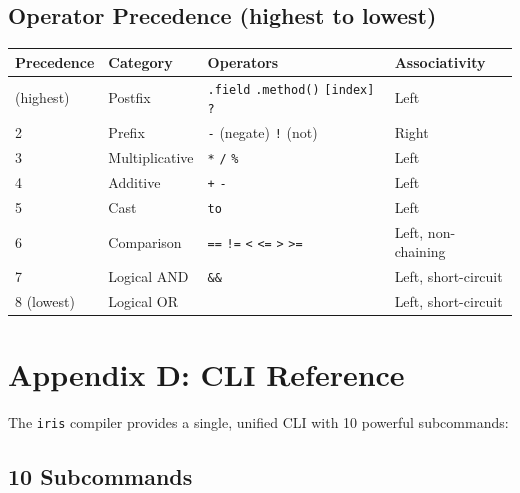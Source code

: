 \documentclass[
  english,
]{book}
\begin{document}
\subsection{Operator Precedence (highest to
lowest)}\label{operator-precedence-highest-to-lowest}

\begin{longtable}[]{@{}llll@{}}
\toprule\noalign{}
Precedence & Category & Operators & Associativity \\
\midrule\noalign{}
\endhead
\bottomrule\noalign{}
\endlastfoot
1 (highest) & Postfix & \texttt{.field} \texttt{.method()}
\texttt{{[}index{]}} \texttt{?} & Left \\
2 & Prefix & \texttt{-} (negate) \texttt{!} (not) & Right \\
3 & Multiplicative & \texttt{*} \texttt{/} \texttt{\%} & Left \\
4 & Additive & \texttt{+} \texttt{-} & Left \\
5 & Cast & \texttt{to} & Left \\
6 & Comparison & \texttt{==} \texttt{!=} \texttt{\textless{}}
\texttt{\textless{}=} \texttt{\textgreater{}} \texttt{\textgreater{}=} &
Left, non-chaining \\
7 & Logical AND & \texttt{\&\&} & Left, short-circuit \\
8 (lowest) & Logical OR & \texttt{\textbar{}\textbar{}} & Left,
short-circuit \\
\end{longtable}

\section{Appendix D: CLI Reference}\label{appendix-d-cli-reference}

The \texttt{iris} compiler provides a single, unified CLI with 10
powerful subcommands:

\subsection{10 Subcommands}\label{subcommands}
\end{document}

